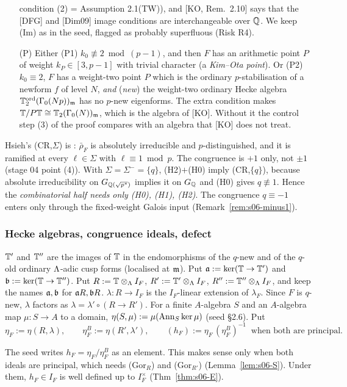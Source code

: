 \begin{hypothesis}
\begin{itemize}
  condition (2) = Assumption 2.1(TW)), and [KO, Rem.~2.10] says that the [DFG] and [Dim09] image conditions are interchangeable over
  $\Q$. We keep (Im) as in the seed, flagged as probably superfluous (Risk R4).
\item[(P)] Either (P1) $k_0\not\equiv2\bmod(p-1)$, and then $F$ has an arithmetic point $P$ of weight $k_P\in[3,p-1]$ with trivial
  character (a \emph{Kim--Ota point}). Or (P2) $k_0\equiv2$, $F$ has a weight-two point $P$ which is the ordinary
  $p$-stabilisation of a newform $f$ of level $N$, \emph{and} (\emph{new}) the weight-two ordinary Hecke algebra
  $\mathbb{T}^{\mathrm{ord}}_2(\Gamma_0(Np))_{\mathfrak{m}}$ has no $p$-new eigenforms. The extra condition makes $\mathbb{T}/P\mathbb{T}\cong\mathbb{T}_2(\Gamma_0(N))_{\mathfrak{m}}$,
  which is the algebra of [KO]. Without it the control step (3) of the proof compares with an algebra that [KO] does not treat.
\end{itemize}
\end{hypothesis}

\begin{remark}\label{rem:s06-CR}
Hsieh's (CR,$\Sigma$) is : $\bar\rho_F$ is absolutely irreducible and $p$-distinguished, and
it is ramified at every $\ell\in\Sigma$ with $\ell\equiv1\bmod p$. The congruence is $+1$ only, not $\pm1$ (stage 04 point (4)). With
$\Sigma=\Sigma^-=\{q\}$, (H2)$+$(H0) imply (CR,$\{q\}$), because absolute irreducibility on $G_{\mathbb{Q}(\sqrt{p^*})}$ implies it on
$G_{\mathbb{Q}}$ and (H0) gives $q\not\equiv1$. Hence the \emph{combinatorial half needs only (H0), (H1), (H2)}. The congruence
$q\equiv-1$ enters only through the fixed-weight Galois input (Remark~\ref{rem:s06-minus1}).
\end{remark}

\subsubsection{Hecke algebras, congruence ideals, defect}\label{ss:s06-rings}
\begin{definition}[seed \S9.1]\label{def:s06-rings}
$\mathbb{T}'$ and $\mathbb{T}''$ are the images of $\mathbb{T}$ in the endomorphisms of the $q$-new and of the $q$-old ordinary $\Lambda$-adic cusp forms
(localised at $\mathfrak{m}$). Put $\mathfrak{a}:=\ker(\mathbb{T}\to\mathbb{T}')$ and $\mathfrak{b}:=\ker(\mathbb{T}\to\mathbb{T}'')$. Put $R:=\mathbb{T}\otimes_\Lambda I_F$, $R':=\mathbb{T}'\otimes_\Lambda I_F$,
$R'':=\mathbb{T}''\otimes_\Lambda I_F$, and keep the names $\mathfrak{a},\mathfrak{b}$ for $\mathfrak{a} R,\mathfrak{b} R$. $\lambda:R\to I_F$ is the $I_F$-linear extension of
$\lambda_F$. Since $F$ is $q$-new, $\lambda$ factors as $\lambda=\lambda'\circ(R\to R')$. For a finite $A$-algebra $S$ and an
$A$-algebra map $\mu:S\to A$ to a domain, $\eta(S,\mu):=\mu(\operatorname{Ann}_S\ker\mu)$ (seed \S2.6). Put
\[\eta_F:=\eta(R,\lambda),\qquad \eta^B_F:=\eta(R',\lambda'),\qquad (h_F):=\eta_F\,(\eta^B_F)^{-1}\ \text{ when both are principal.}\]
\end{definition}
The seed writes $h_F=\eta_F/\eta^B_F$ as an element. This makes sense only when both ideals are principal, which needs (Gor$_R$) and
(Gor$_{R'}$) (Lemma~\ref{lem:s06-S}). Under them, $h_F\in I_F$ is well defined up to $I_F^\times$ (Thm~\ref{thm:s06-E}).

